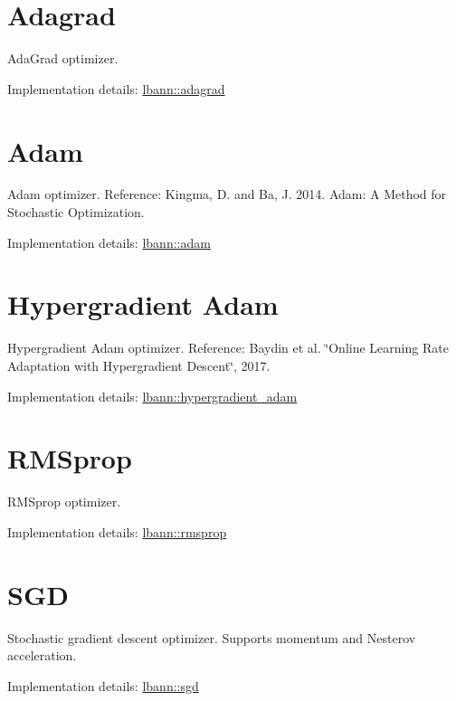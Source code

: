 \hypertarget{optimizers_Adagrad}{}\section{Adagrad}\label{optimizers_Adagrad}
Ada\+Grad optimizer.

Implementation details\+: \hyperlink{classlbann_1_1adagrad}{lbann\+::adagrad}\hypertarget{optimizers_Adam}{}\section{Adam}\label{optimizers_Adam}
Adam optimizer. Reference\+: Kingma, D. and Ba, J. 2014. Adam\+: A Method for Stochastic Optimization.

Implementation details\+: \hyperlink{classlbann_1_1adam}{lbann\+::adam}\hypertarget{optimizers_hadam}{}\section{Hypergradient Adam}\label{optimizers_hadam}
Hypergradient Adam optimizer. Reference\+: Baydin et al. \char`\"{}\+Online Learning Rate Adaptation with Hypergradient Descent\char`\"{}, 2017.

Implementation details\+: \hyperlink{classlbann_1_1hypergradient__adam}{lbann\+::hypergradient\+\_\+adam}\hypertarget{optimizers_rmsp}{}\section{R\+M\+Sprop}\label{optimizers_rmsp}
R\+M\+Sprop optimizer.

Implementation details\+: \hyperlink{classlbann_1_1rmsprop}{lbann\+::rmsprop}\hypertarget{optimizers_SGD}{}\section{S\+GD}\label{optimizers_SGD}
Stochastic gradient descent optimizer. Supports momentum and Nesterov acceleration.

Implementation details\+: \hyperlink{classlbann_1_1sgd}{lbann\+::sgd} 